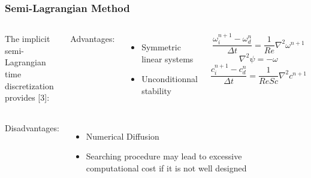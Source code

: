 
\begin{frame} 
 \frametitle{\LARGE Semi-Lagrangian Method}

\begin{columns}[c]
\justifying
The implicit semi-Lagrangian time discretization provides [3]:

\medskip
Advantages:
\begin{itemize}
 \justifying
 \item Symmetric linear systems\\
 \item Unconditionnal stability
\end{itemize}

\vspace{-0.5cm}
\begin{equation*}
 \frac{\omega_{i}^{n+1} - \omega_{d}^{n}}{\Delta t} = \frac{1}{Re} \nabla^{2} \omega^{n+1}
\end{equation*}
\begin{equation*}
 \nabla^{2} \psi = - \omega
\end{equation*}
\begin{equation*}
 \frac{c_{i}^{n+1} - c_{d}^{n}}{\Delta t} = \frac{1}{ReSc} \nabla^{2} c^{n+1}
\end{equation*}
\end{columns}

\vspace{0.8cm}
\begin{columns}[c]
\vspace{-0.6cm}
\justifying

Disadvantages:
\begin{itemize}
 \justifying
 \item Numerical Diffusion\\
 \item Searching procedure may lead to excessive computational cost
       if it is not well designed
\end{itemize}


\vspace{-0.5cm}
\begin{center}
\end{center}
\end{columns}
\end{frame}
